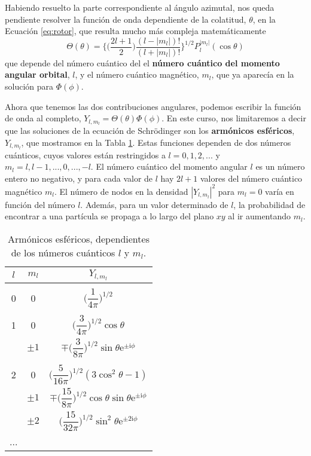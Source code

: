 Habiendo resuelto la parte correspondiente al ángulo 
azimutal, nos queda pendiente resolver la función de onda
dependiente de la colatitud, $\theta$, en la Ecuación
\ref{eq:rotor}, que resulta mucho más compleja 
matemáticamente
\begin{equation}
    \Theta(\theta)=\bigg\{ 
    \bigg(
    \frac{2l+1}{2}
    \bigg)
    \frac{(l-|m_l|)!}{(l+|m_l|)!}
    \bigg\}^{1/2}
    P_l^{|m_l|}(\cos\theta)
\end{equation}
que depende del número cuántico del el \textbf{número 
cuántico del momento angular orbital}, $l$, y el número cuántico magnético, $m_l$, que ya aparecía en la solución
para $\Phi(\phi)$. 

Ahora que tenemos las dos contribuciones angulares, 
podemos escribir la función de onda al completo,
$Y_{l,m_l}=\Theta(\theta)\Phi(\phi)$. 
En este curso, nos limitaremos a decir que las 
soluciones de la ecuación de Schrödinger son los
\textbf{armónicos esféricos}, $Y_{l,m_l}$, 
que mostramos en la Tabla \ref{tb:legendre}. Estas 
funciones dependen de dos números cuánticos, cuyos 
valores están restringidos a $l=0,1,2,...$ y 
$m_l=l, l-1,...,0,...,-l$. El número cuántico del 
momento angular $l$ es un número entero no negativo, y 
para cada valor de $l$ hay $2l+1$ valores del número 
cuántico magnético $m_l$. El número de nodos en la 
densidad $|Y_{l,m_l}|^2$ para $m_l=0$ varía en función 
del número $l$. Además, para un valor determinado de $l$,
la probabilidad de encontrar a una partícula se propaga 
a lo largo del plano $xy$ al ir aumentando $m_l$.

\begin{table}[t!]
    \centering
    \begin{tabular}{c|c|c}
     $l$ & $m_l$ & $ Y_{l,m_l}$ \\
     \hline
     & & \\
    0 & 0       & $\bigg(\dfrac{1}{4\pi}\bigg)^{1/2}$\\ 
     & & \\
    1 & 0       & $\bigg(\dfrac{3}{4\pi}\bigg)^{1/2}\cos{\theta}$ \\ 
      & $\pm 1$ & $\mp\bigg(\dfrac{3}{8\pi}\bigg)^{1/2}\sin{\theta}\mathrm{e}^{\pm \mathrm{i}\phi}$ \\ 
     & & \\
    2 & 0       & $\bigg(\dfrac{5}{16\pi}\bigg)^{1/2}(3\cos^2\theta-1)$ \\ 
      & $\pm 1$  & $\mp\bigg(\dfrac{15}{8\pi}\bigg)^{1/2}\cos\theta\sin\theta\mathrm{e}^{\pm \mathrm{i}\phi}$  \\ 
      & $\pm 2$  & $\bigg(\dfrac{15}{32\pi}\bigg)^{1/2}\sin^2\theta\mathrm{e}^{\pm 2\mathrm{i}\phi}$ \\ 
    ... &  &
    \end{tabular}
    \caption{Armónicos esféricos, dependientes de los números
    cuánticos $l$ y $m_l$.}
    \label{tb:legendre}
\end{table}


